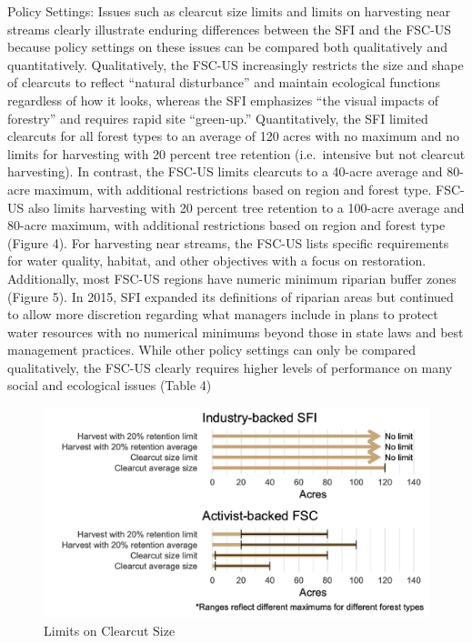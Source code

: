 \documentclass[
      12pt,
            Review ]{article}
\begin{document}
Policy Settings: Issues such as clearcut size limits and limits on
harvesting near streams clearly illustrate enduring differences between
the SFI and the FSC-US because policy settings on these issues can be
compared both qualitatively and quantitatively. Qualitatively, the
FSC-US increasingly restricts the size and shape of clearcuts to reflect
``natural disturbance'' and maintain ecological functions regardless of
how it looks, whereas the SFI emphasizes ``the visual impacts of
forestry'' and requires rapid site ``green-up.'' Quantitatively, the SFI
limited clearcuts for all forest types to an average of 120 acres with
no maximum and no limits for harvesting with 20 percent tree retention
(i.e.~intensive but not clearcut harvesting). In contrast, the FSC-US
limits clearcuts to a 40-acre average and 80-acre maximum, with
additional restrictions based on region and forest type. FSC-US also
limits harvesting with 20 percent tree retention to a 100-acre average
and 80-acre maximum, with additional restrictions based on region and
forest type (Figure 4). For harvesting near streams, the FSC-US lists
specific requirements for water quality, habitat, and other objectives
with a focus on restoration. Additionally, most FSC-US regions have
numeric minimum riparian buffer zones (Figure 5). In 2015, SFI expanded
its definitions of riparian areas but continued to allow more discretion
regarding what managers include in plans to protect water resources with
no numerical minimums beyond those in state laws and best management
practices. While other policy settings can only be compared
qualitatively, the FSC-US clearly requires higher levels of performance
on many social and ecological issues (Table 4)

\begin{figure}
\centering
\includegraphics{Figs/clearcuts-1.png}
\caption{Limits on Clearcut Size}
\end{figure}
\end{document}
